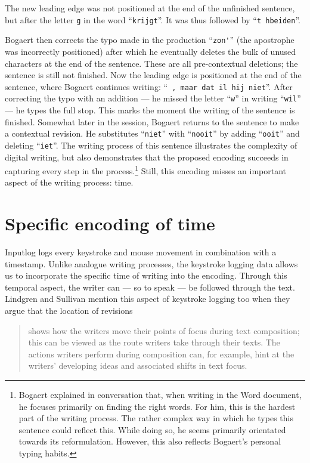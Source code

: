 \begin{paper}
\noindent The new leading edge was not positioned
at the end of the unfinished sentence, but after the letter \verb|g| in the
word ``\verb|krijgt|''. It was thus followed by ``\verb|t hbeiden|''.

Bogaert then corrects the typo made in the production ``\verb|zon'|'' (the
apostrophe was incorrectly positioned) after which he eventually
deletes the bulk of unused characters at the end of the sentence. These
are all pre-contextual deletions; the sentence is still not finished. Now
the leading edge is positioned at the end of the sentence, where Bogaert
continues writing: ``\verb| , maar dat il hij niet|''. After correcting the
typo with an addition --- he missed the letter ``\verb|w|'' in writing ``\verb|wil|''
--- he types the full stop. This marks the moment the writing of the
sentence is finished. Somewhat later in the session, Bogaert returns to
the sentence to make a contextual revision. He substitutes ``\verb|niet|'' with
``\verb|nooit|'' by adding ``\verb|ooit|'' and deleting ``\verb|iet|''. The writing process
of this sentence illustrates the complexity of digital writing, but also demonstrates that the proposed 
encoding succeeds in capturing every step in the process.\footnote{Bogaert
  explained in conversation that, when writing in the Word document, he
  focuses primarily on finding the right words. For him, this is the
  hardest part of the writing process. The rather complex way in which
  he types this sentence could reflect this. While doing so, he seems
  primarily orientated towards its reformulation. However, this also
  reflects Bogaert's personal typing habits.} Still, this encoding misses an important
aspect of the writing process: time.

\section{Specific encoding of time}\label{specific-encoding-of-time}

Inputlog logs every keystroke and mouse movement in combination with a
timestamp. Unlike analogue writing processes, the keystroke logging data
allows us to incorporate the specific time of writing into the encoding.
Through this temporal aspect, the writer can --- so to speak --- be
followed through the text. Lindgren and Sullivan mention this aspect of
keystroke logging too when they argue that the location of revisions

\begin{quote}
shows how the writers move their points of focus during text
composition; this can be viewed as the route writers take through their
texts. The actions writers perform during composition can, for example,
hint at the writers' developing ideas and associated shifts in text
focus.
\begin{flushright}
\citep[39]{lindgren_writing_2006}
\end{flushright}
\end{quote}


\end{paper}
